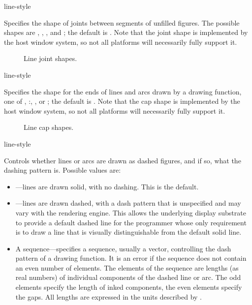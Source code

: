  {line-style}

Specifies the shape of joints between segments of unfilled figures.  The
possible shapes are , , , and ; the
default is .  Note that the joint shape is implemented by the host
window system, so not all platforms will necessarily fully support it.

\begin{figure}
\ifpsfig\centerline{}\else\vspace{1.25in}\fi
\caption{Line joint shapes.}
\end{figure}

 {line-style}

Specifies the shape for the ends of lines and arcs drawn by a drawing function,
one of , :, , or ; the default
is .  Note that the cap shape is implemented by the host window
system, so not all platforms will necessarily fully support it.

\begin{figure}
\ifpsfig\centerline{}\else\vspace{1.75in}\fi
\caption{Line cap shapes.}
\end{figure}

 {line-style}

Controls whether lines or arcs are drawn as dashed figures, and if so, what the
dashing pattern is.  Possible values are:

\begin{itemize}
\item {}---lines are drawn solid, with no dashing.  This is the default.

\item {}---lines are drawn dashed, with a dash pattern that is unspecified
and may vary with the rendering engine.  This allows the underlying display
substrate to provide a default dashed line for the programmer whose only
requirement is to draw a line that is visually distinguishable from the default
solid line.

\item A sequence---specifies a sequence, usually a vector, controlling the dash
pattern of a drawing function.  It is an error if the sequence does not contain
an even number of elements.  The elements of the sequence are lengths (as real
numbers) of individual components of the dashed line or arc.  The odd elements
specify the length of inked components, the even elements specify the gaps.  All
lengths are expressed in the units described by .
\end{itemize}

